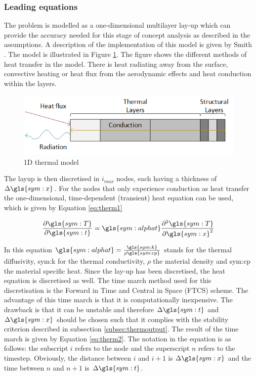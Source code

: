\subsubsection{Leading equations}
The problem is modelled as a one-dimensional multilayer lay-up which can provide the accuracy needed for this stage of concept analysis as described in the assumptions. A description of the implementation of this model is given by Smith \cite{Smith2011}. The model is illustrated in Figure \ref{fig:1dthermal}. The figure shows the different methods of heat transfer in the model. There is heat radiating away from the surface, convective heating or heat flux from the aerodynamic effects and heat conduction within the layers.

\begin{figure}[H]
	\centering
	\includegraphics{Figure/1dthermal.png}
	\caption{1D thermal model}
	\label{fig:1dthermal}
\end{figure}

The layup is then discretised in $i_{max}$ nodes, each having a thickness of $\Delta \gls{sym:x}$. For the nodes that only experience conduction as heat transfer the one-dimensional, time-dependent (transient) heat equation can be used, which is given by Equation \eqref{eq:therm1}

\begin{equation}
\frac{\partial \gls{sym:T}}{\partial \gls{sym:t}} = \gls{sym:alphat}\frac{\partial^2\gls{sym:T}}{\partial \gls{sym:x}^2}
\label{eq:therm1}
\end{equation}


In this equation $\gls{sym:alphat}=\frac{\gls{sym:k}}{\rho \gls{sym:cp}}$ stands for the thermal diffusivity, \gls{sym:k} for the thermal conductivity, $\rho$ the material density and \gls{sym:cp} the material specific heat. Since the lay-up has been discretised, the heat equation is discretised as well. The time march method used for this discretisation is the Forward in Time and Central in Space (FTCS) scheme. The advantage of this time march is that it is computationally inexpensive. The drawback is that it can be unstable and therefore $\Delta \gls{sym:t}$ and $\Delta \gls{sym:x}$ should be chosen such that it complies with the stability criterion described in subsection \ref{subsec:thermoutput}. The result of the time march is given by Equation \eqref{eq:therm2}. The notation in the equation is as follows: the subscript $i$ refers to the node and the superscript $n$ refers to the timestep. Obviously, the distance between $i$ and $i+1$ is $\Delta \gls{sym:x}$ and the time between $n$ and $n+1$ is $\Delta \gls{sym:t}$.


